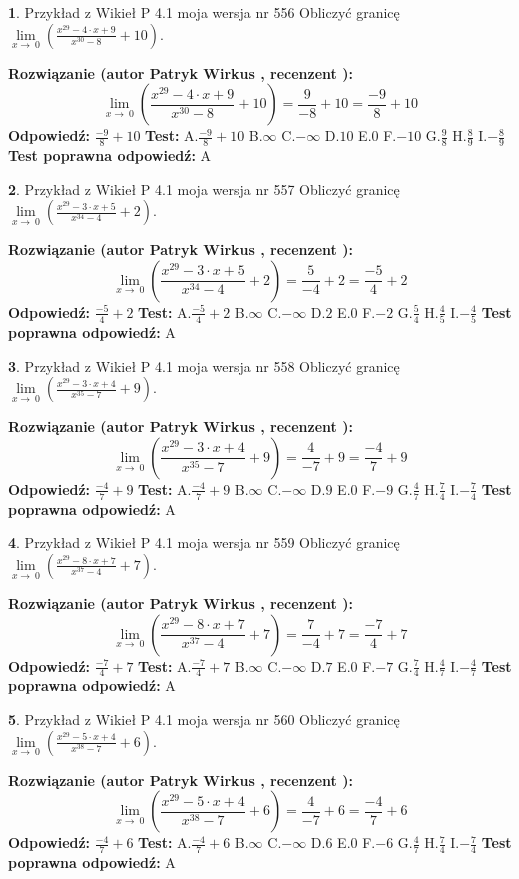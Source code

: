 \documentclass[12pt, a4paper]{article}
\theoremstyle{definition} %
\newtheorem{zad}{}
\newcommand{\zadStart}[1]{\begin{zad}#1\newline}
\newcommand{\zadStop}{\end{zad}}
\newcommand{\rozwStart}[2]{\noindent \textbf{Rozwiązanie (autor #1 , recenzent #2): }\newline}
\newcommand{\rozwStop}{\newline}
\newcommand{\odpStart}{\noindent \textbf{Odpowiedź:}\newline}
\newcommand{\odpStop}{\newline}
\newcommand{\testStart}{\noindent \textbf{Test:}\newline}
\newcommand{\testStop}{\newline}
\newcommand{\kluczStart}{\noindent \textbf{Test poprawna odpowiedź:}\newline}
\newcommand{\kluczStop}{\newline}
\begin{document}
\zadStart{Przykład z Wikieł P 4.1 moja wersja nr 556}
Obliczyć granicę $\lim\limits_{x\to\ 0}(\frac{x^{29}-4 \cdot x +9}{x^{30}-8}+10)$.
\zadStop
\rozwStart{Patryk Wirkus}{}
$$\lim\limits_{x\to\ 0}(\frac{x^{29}-4 \cdot x +9}{x^{30}-8}+10)=\frac{9}{-8}+10=\frac{-9}{8}+10$$
\rozwStop
\odpStart
$\frac{-9}{8}+10$
\odpStop
\testStart
A.$\frac{-9}{8}+10$
B.$\infty$
C.$-\infty$
D.$10$
E.$0$
F.$-10$
G.$\frac{9}{8}$
H.$\frac{8}{9}$
I.$-\frac{8}{9}$
\testStop
\kluczStart
A
\kluczStop



\zadStart{Przykład z Wikieł P 4.1 moja wersja nr 557}
Obliczyć granicę $\lim\limits_{x\to\ 0}(\frac{x^{29}-3 \cdot x +5}{x^{34}-4}+2)$.
\zadStop
\rozwStart{Patryk Wirkus}{}
$$\lim\limits_{x\to\ 0}(\frac{x^{29}-3 \cdot x +5}{x^{34}-4}+2)=\frac{5}{-4}+2=\frac{-5}{4}+2$$
\rozwStop
\odpStart
$\frac{-5}{4}+2$
\odpStop
\testStart
A.$\frac{-5}{4}+2$
B.$\infty$
C.$-\infty$
D.$2$
E.$0$
F.$-2$
G.$\frac{5}{4}$
H.$\frac{4}{5}$
I.$-\frac{4}{5}$
\testStop
\kluczStart
A
\kluczStop



\zadStart{Przykład z Wikieł P 4.1 moja wersja nr 558}
Obliczyć granicę $\lim\limits_{x\to\ 0}(\frac{x^{29}-3 \cdot x +4}{x^{35}-7}+9)$.
\zadStop
\rozwStart{Patryk Wirkus}{}
$$\lim\limits_{x\to\ 0}(\frac{x^{29}-3 \cdot x +4}{x^{35}-7}+9)=\frac{4}{-7}+9=\frac{-4}{7}+9$$
\rozwStop
\odpStart
$\frac{-4}{7}+9$
\odpStop
\testStart
A.$\frac{-4}{7}+9$
B.$\infty$
C.$-\infty$
D.$9$
E.$0$
F.$-9$
G.$\frac{4}{7}$
H.$\frac{7}{4}$
I.$-\frac{7}{4}$
\testStop
\kluczStart
A
\kluczStop



\zadStart{Przykład z Wikieł P 4.1 moja wersja nr 559}
Obliczyć granicę $\lim\limits_{x\to\ 0}(\frac{x^{29}-8 \cdot x +7}{x^{37}-4}+7)$.
\zadStop
\rozwStart{Patryk Wirkus}{}
$$\lim\limits_{x\to\ 0}(\frac{x^{29}-8 \cdot x +7}{x^{37}-4}+7)=\frac{7}{-4}+7=\frac{-7}{4}+7$$
\rozwStop
\odpStart
$\frac{-7}{4}+7$
\odpStop
\testStart
A.$\frac{-7}{4}+7$
B.$\infty$
C.$-\infty$
D.$7$
E.$0$
F.$-7$
G.$\frac{7}{4}$
H.$\frac{4}{7}$
I.$-\frac{4}{7}$
\testStop
\kluczStart
A
\kluczStop



\zadStart{Przykład z Wikieł P 4.1 moja wersja nr 560}
Obliczyć granicę $\lim\limits_{x\to\ 0}(\frac{x^{29}-5 \cdot x +4}{x^{38}-7}+6)$.
\zadStop
\rozwStart{Patryk Wirkus}{}
$$\lim\limits_{x\to\ 0}(\frac{x^{29}-5 \cdot x +4}{x^{38}-7}+6)=\frac{4}{-7}+6=\frac{-4}{7}+6$$
\rozwStop
\odpStart
$\frac{-4}{7}+6$
\odpStop
\testStart
A.$\frac{-4}{7}+6$
B.$\infty$
C.$-\infty$
D.$6$
E.$0$
F.$-6$
G.$\frac{4}{7}$
H.$\frac{7}{4}$
I.$-\frac{7}{4}$
\testStop
\kluczStart
A
\kluczStop
\end{document}
